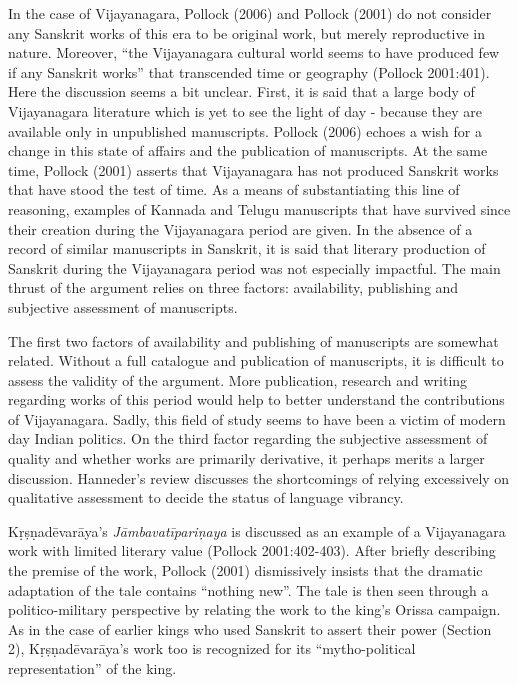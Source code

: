 In the case of Vijayanagara, Pollock (2006) and Pollock (2001) do not consider any Sanskrit works of this era to be original work, but merely reproductive in nature. Moreover, “the Vijayanagara cultural world seems to have produced few if any Sanskrit works” that transcended time or geography (Pollock 2001:401). Here the discussion seems a bit unclear. First, it is said that a large body of Vijayanagara literature which is yet to see the light of day - because they are available only in unpublished manuscripts. Pollock (2006) echoes a wish for a change in this state of affairs and the publication of manuscripts. At the same time, Pollock (2001) asserts that Vijayanagara has not produced Sanskrit works that have stood the test of time. As a means of substantiating this line of reasoning, examples of Kannada and Telugu manuscripts that have survived since their creation during the Vijayanagara period are given. In the absence of a record of similar manuscripts in Sanskrit, it is said that literary production of Sanskrit during the Vijayanagara period was not especially impactful. The main thrust of the argument relies on three factors: availability, publishing and subjective assessment of manuscripts.
\vskip 1.5pt

The first two factors of availability and publishing of manuscripts are somewhat related. Without a full catalogue and publication of manuscripts, it is difficult to assess the validity of the argument. More publication, research and writing regarding works of this period would help to better understand the contributions of Vijayanagara. Sadly, this field of study seems to have been a victim of modern day Indian politics. On the third factor regarding the subjective assessment of quality and whether works are primarily derivative, it perhaps merits a larger discussion. Hanneder’s review discusses the shortcomings of relying excessively on qualitative assessment to decide the status of language vibrancy. 
\vskip 1.5pt

Kṛṣṇadēvarāya’s {\sl Jāmbavatīpariṇaya} is discussed as an example of a Vijayanagara work with limited literary value (Pollock 2001:402-403). After briefly describing the premise of the work, Pollock (2001) dismissively insists that the dramatic adaptation of the tale contains “nothing new”. The tale is then seen through a politico-military perspective by relating the work to the king’s Orissa campaign. As in the case of earlier kings who used Sanskrit to assert their power (Section 2), Kṛṣṇadēvarāya’s work too is recognized for its “mytho-political representation” of the king.
\vskip 1.5pt

